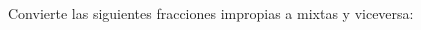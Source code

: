 \documentclass[12pt,addpoints]{evalua}
\begin{document}
\begin{questions}
    \subsection*{\else{}\fi}

    \question[8] Convierte las siguientes fracciones impropias a mixtas y viceversa:
    \begin{multicols}{3}
    \end{multicols}
\end{questions}
\end{document}
